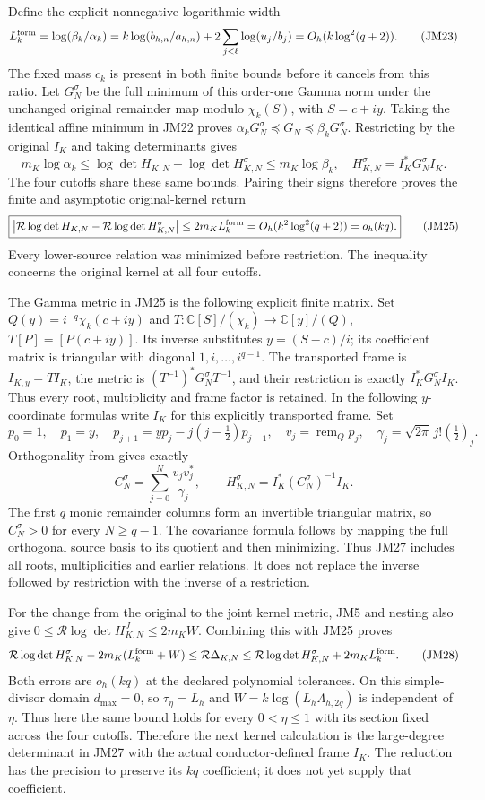 \documentclass[11pt]{article}
\newcommand{\C}{\mathbb C}
\begin{document}
Define the explicit nonnegative logarithmic width
\[
 L_k^{\rm form}=\log(\beta_k/\alpha_k)
 =k\log(b_{h,n}/a_{h,n})
   +2\sum_{j<\ell}\log(u_j/b_j)
 =O_h(k\log^2(q+2)).\tag{JM23}
\]
The fixed mass $c_k$ is present in both finite bounds before it
cancels from this ratio. Let $G_N^\sigma$ be the full minimum of
this order-one Gamma norm under the unchanged original remainder
map modulo $\chi_k(S)$, with $S=c+iy$.
Taking the identical affine minimum in JM22 proves
$\alpha_kG_N^\sigma\preceq G_N\preceq\beta_kG_N^\sigma$.
Restricting by the original $I_K$ and taking determinants gives
\[
 m_K\log\alpha_k\le
 \log\det H_{K,N}-\log\det H_{K,N}^\sigma
 \le m_K\log\beta_k,
 \quad H_{K,N}^\sigma=I_K^*G_N^\sigma I_K.\tag{JM24}
\]
The four cutoffs share these same bounds. Pairing their signs
therefore proves the finite and asymptotic original-kernel return
\[
 \boxed{\left|\mathcal R\log\det H_{K,N}
 -\mathcal R\log\det H_{K,N}^\sigma\right|
 \le2m_KL_k^{\rm form}=O_h(k^2\log^2(q+2))=o_h(kq).}
 \tag{JM25}
\]
Every lower-source relation was minimized before restriction.
The inequality concerns the original kernel at all four cutoffs.

The Gamma metric in JM25 is the following explicit finite matrix.
Set $Q(y)=i^{-q}\chi_k(c+iy)$ and
$T:\C[S]/(\chi_k)\longrightarrow\C[y]/(Q)$,
$T[P]=[P(c+iy)]$. Its inverse substitutes $y=(S-c)/i$;
its coefficient matrix is triangular with diagonal $1,i,\ldots,i^{q-1}$.
The transported frame is $I_{K,y}=TI_K$, the metric is
$(T^{-1})^*G_N^\sigma T^{-1}$, and their restriction is exactly
$I_K^*G_N^\sigma I_K$. Thus every root, multiplicity and frame
factor is retained. In the following $y$-coordinate formulas write
$I_K$ for this explicitly transported frame. Set
\[
 p_0=1,\quad p_1=y,\quad
 p_{j+1}=yp_j-j(j-\tfrac12)p_{j-1},\quad
 v_j=\operatorname{rem}_{Q}p_j,\quad
 \gamma_j=\sqrt{2\pi}\,j!(\tfrac12)_j.
 \tag{JM26}
\]
Orthogonality from \cite{MP} gives exactly
\[
 C_N^\sigma=\sum_{j=0}^N\frac{v_jv_j^*}{\gamma_j},\qquad
 H_{K,N}^\sigma=I_K^*(C_N^\sigma)^{-1}I_K.\tag{JM27}
\]
The first $q$ monic remainder columns form an invertible triangular
matrix, so $C_N^\sigma>0$ for every $N\ge q-1$. The covariance
formula follows by mapping the full orthogonal source basis to its
quotient and then minimizing. Thus JM27 includes all roots,
multiplicities and earlier relations. It does not replace the
inverse followed by restriction with the inverse of a restriction.

For the change from the original to the joint kernel metric,
JM5 and nesting also give
$0\le\mathcal R\log\det H_{K,N}^J\le2m_KW$.
Combining this with JM25 proves
\[
 \mathcal R\log\det H_{K,N}^\sigma-2m_K(L_k^{\rm form}+W)
 \le\mathcal R\Delta_{K,N}
 \le\mathcal R\log\det H_{K,N}^\sigma+2m_KL_k^{\rm form}.
 \tag{JM28}
\]
Both errors are $o_h(kq)$ at the declared polynomial tolerances.
On this simple-divisor domain $d_{\max}=0$, so
$\tau_\eta=L_h$ and $W=k\log(L_h\Lambda_{h,2q})$ is independent of
$\eta$. Thus here the same bound holds for every $0<\eta\le1$
with its section fixed across the four cutoffs.
Therefore the next kernel calculation is the large-degree
determinant in JM27 with the actual conductor-defined frame $I_K$.
The reduction has the precision to preserve its $kq$ coefficient;
it does not yet supply that coefficient.
\end{document}
